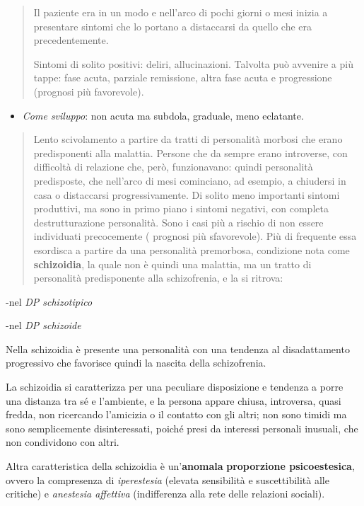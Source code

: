 \documentclass[]{article}
\begin{document}
\begin{quote}
Il paziente era in un modo e nell'arco di pochi giorni o mesi inizia a
presentare sintomi che lo portano a distaccarsi da quello che era
precedentemente.

Sintomi di solito positivi: deliri, allucinazioni. Talvolta può avvenire
a più tappe: fase acuta, parziale remissione, altra fase acuta e
progressione (prognosi più favorevole).
\end{quote}

\begin{itemize}
\item
  \emph{Come sviluppo}: non acuta ma subdola, graduale, meno eclatante.
\end{itemize}

\begin{quote}
Lento scivolamento a partire da tratti di personalità morbosi che erano
predisponenti alla malattia. Persone che da sempre erano introverse, con
difficoltà di relazione che, però, funzionavano: quindi personalità
predisposte, che nell'arco di mesi cominciano, ad esempio, a chiudersi
in casa o distaccarsi progressivamente. Di solito meno importanti
sintomi produttivi, ma sono in primo piano i sintomi negativi, con
completa destrutturazione personalità. Sono i casi più a rischio di non
essere individuati precocemente ( prognosi più sfavorevole). Più di
frequente essa esordisca a partire da una personalità premorbosa,
condizione nota come \textbf{schizoidia}, la quale non è quindi una
malattia, ma un tratto di personalità predisponente alla schizofrenia, e
la si ritrova:
\end{quote}

-nel \emph{DP schizotipico}

-nel \emph{DP schizoide}

Nella schizoidia è presente una personalità con una tendenza al
disadattamento progressivo che favorisce quindi la nascita della
schizofrenia.

La schizoidia si caratterizza per una peculiare disposizione e tendenza
a porre una distanza tra sé e l'ambiente, e la persona appare chiusa,
introversa, quasi fredda, non ricercando l'amicizia o il contatto con
gli altri; non sono timidi ma sono semplicemente disinteressati, poiché
presi da interessi personali inusuali, che non condividono con altri.

Altra caratteristica della schizoidia è un'\textbf{anomala}
\textbf{proporzione psicoestesica}, ovvero la compresenza di
\emph{iperestesia} (elevata sensibilità e suscettibilità alle critiche)
e \emph{anestesia affettiva} (indifferenza alla rete delle relazioni
sociali).
\end{document}
